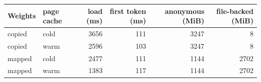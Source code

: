 \begin{tabular}{llrrrr}
\toprule
Weights & page cache & load (ms) & first token (ms) & anonymous (MiB) & file-backed (MiB) \\
\midrule
copied & cold & 3656 & 111 & 3247 & 8 \\
copied & warm & 2596 & 103 & 3247 & 8 \\
mapped & cold & 2477 & 111 & 1144 & 2702 \\
mapped & warm & 1383 & 117 & 1144 & 2702 \\
\bottomrule
\end{tabular}
